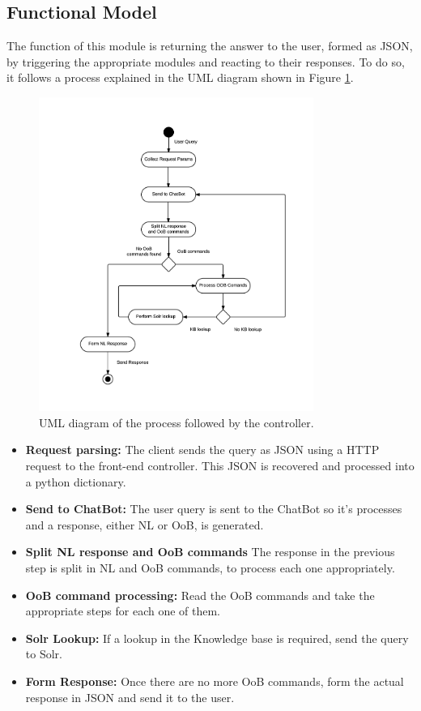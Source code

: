 \subsection{Functional Model}
\label{subsec:functmodel}

The function of this module is returning the answer to the user, formed as JSON, by triggering the appropriate modules and reacting to their responses. To do so, it follows a process explained in the UML diagram shown in Figure \ref{fig:fe-model1}.

\begin{figure}[!htbp]
    \centering
    \includegraphics[width=0.8\textwidth]{img/prot/activityDiagram.png} 
    \caption{UML diagram of the process followed by the controller.}
    \label{fig:fe-model1}
\end{figure}

\begin{itemize}
 \item \textbf{Request parsing:} The client sends the query as JSON using a HTTP request to the front-end controller. This JSON is recovered and processed into a python dictionary.
 \item \textbf{Send to ChatBot:} The user query is sent to the ChatBot so it's processes and a response, either \ac{NL} or \ac{OoB}, is generated.
 \item \textbf{Split \ac{NL} response and \ac{OoB} commands} The response in the previous step is split in \ac{NL} and {OoB} commands, to process each one appropriately.
 \item \textbf{\ac{OoB} command processing:} Read the \ac{OoB} commands and take the appropriate steps for each one of them.
 \item \textbf{Solr Lookup:} If a lookup in the Knowledge base is required, send the query to Solr.
 \item \textbf{Form Response:} Once there are no more \ac{OoB} commands, form the actual response in JSON and send it to the user.
\end{itemize}

